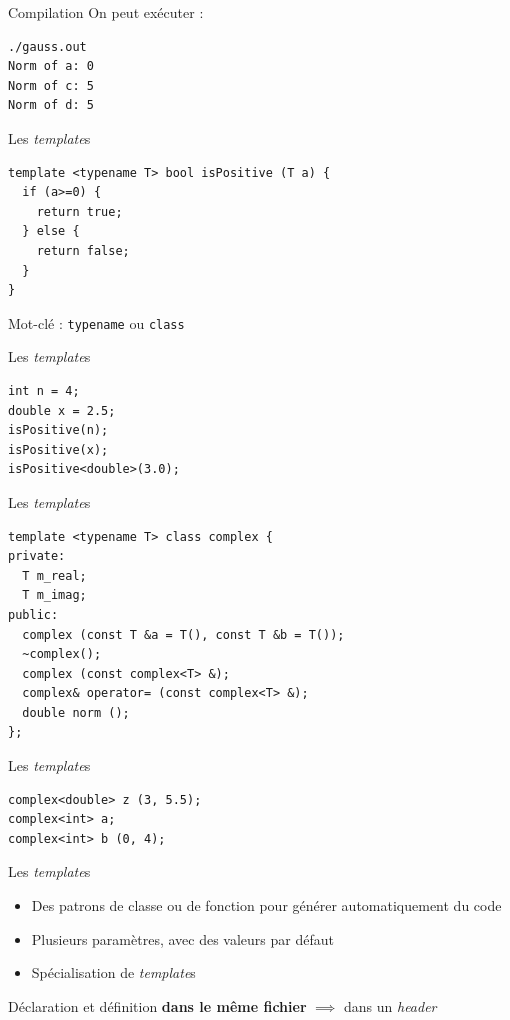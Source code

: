 \begin{frame}[fragile]{Compilation}
  On peut exécuter :
  \begin{lstlisting}
./gauss.out
Norm of a: 0
Norm of c: 5
Norm of d: 5
  \end{lstlisting}
\end{frame}

\begin{frame}[fragile]{Les \textit{template}s}
  \begin{lstlisting}
template <typename T> bool isPositive (T a) {
  if (a>=0) {
    return true;
  } else {
    return false;
  }
}
  \end{lstlisting}

  Mot-clé : \texttt{typename} ou \texttt{class}
\end{frame}

\begin{frame}[fragile]{Les \textit{template}s}
  \begin{lstlisting}
int n = 4;
double x = 2.5;
isPositive(n);
isPositive(x);
isPositive<double>(3.0);
  \end{lstlisting}
\end{frame}

\begin{frame}[fragile]{Les \textit{template}s}
  \begin{lstlisting}
template <typename T> class complex {
private:
  T m_real;
  T m_imag;
public:
  complex (const T &a = T(), const T &b = T());
  ~complex();
  complex (const complex<T> &);
  complex& operator= (const complex<T> &);
  double norm ();
};
  \end{lstlisting}
\end{frame}

\begin{frame}[fragile]{Les \textit{template}s}
  \begin{lstlisting}
complex<double> z (3, 5.5);
complex<int> a;
complex<int> b (0, 4);
  \end{lstlisting}
\end{frame}

\begin{frame}{Les \textit{template}s}
  \begin{itemize}
  \item  Des patrons de classe ou de fonction pour générer automatiquement du code
  \item Plusieurs paramètres, avec des valeurs par défaut
  \item Spécialisation de \textit{template}s
  \end{itemize}

  Déclaration et définition \textbf{dans le même fichier} $\implies$ dans un \textit{header}
\end{frame}

